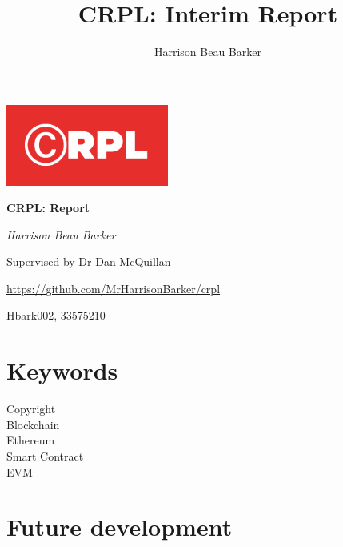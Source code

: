 \documentclass[12pt]{article}
\title{CRPL: Interim Report}
\author{Harrison Beau Barker}
\begin{document}
\begin{titlepage}
	\centering
	\includegraphics[width=0.4\textwidth]{crpl}\par
	\vspace{1cm}
	{\huge\bfseries CRPL: Report\par}
	\vspace{2cm}
	{\Large\itshape Harrison Beau Barker\par}
	{Supervised by Dr Dan McQuillan\par}
	\vfill
	{\url{https://github.com/MrHarrisonBarker/crpl}\par}
	\vspace{1cm}
	{\large Hbark002, 33575210\par}
\end{titlepage}


\tableofcontents{}

\section{Keywords}

\begin{description}
	\item[Copyright]
	\item[Blockchain]
	\item[Ethereum]
	\item[Smart Contract]
	\item[EVM] 
\end{description}













\section{Future development}
\end{document}
